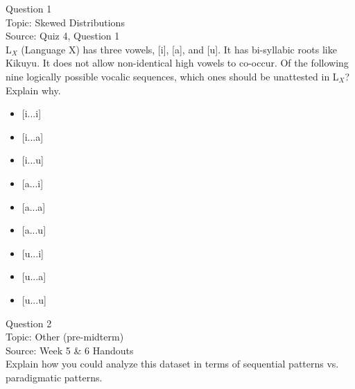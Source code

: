 \documentclass[12pt]{article}
\begin{document}
\begin{center}
\textbf{{\color{violet}{\HUGE 20201113 Friday\\}}}

\textbf{{\color{violet}{\HUGE ALL EXAMS\\}}}

\end{center}
\newpage

\begin{center}
\textbf{{\color{blue}{\HUGE START OF EXAM\\}}}

\textbf{{\color{blue}{\HUGE Student ID: 45248\\}}}

\textbf{{\color{blue}{\HUGE 4:00\\}}}

\end{center}
\newpage

{\large Question 1}\\

Topic: Skewed Distributions\\
Source: Quiz 4, Question 1\\

L$_X$ (Language X) has three vowels, [i], [a], and [u]. It has bi-syllabic roots like Kikuyu. It does not allow non-identical high vowels to co-occur. Of the following nine logically possible vocalic sequences, which ones should be unattested in L$_X$? Explain why.\\

\begin{itemize} \item {[i...i]} \item {[i...a]} \item {[i...u]} \item {[a...i]} \item {[a...a]} \item {[a...u]} \item {[u...i]} \item {[u...a]} \item {[u...u]} \end{itemize}


\newpage

{\large Question 2}\\

Topic: Other (pre-midterm)\\
Source: Week 5 \& 6 Handouts\\

Explain how you could analyze this dataset in terms of sequential patterns vs. paradigmatic patterns.\\
\end{document}
